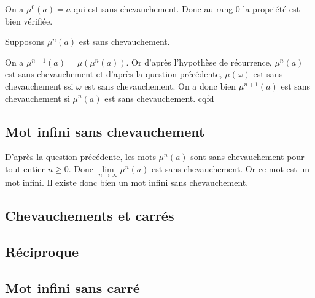 On a $\mu^0(a) = a$ qui est sans chevauchement. Donc au rang $0$ la propriété est bien vérifiée.

Supposons $\mu^n(a)$ est sans chevauchement.

On a $\mu^{n+1}(a) = \mu(\mu^{n}(a))$. Or d'après l'hypothèse de récurrence, $\mu^n(a)$ est sans chevauchement et d'après la question précédente, $\mu(\omega)$ est sans chevauchement ssi $\omega$ est sans chevauchement. On a donc bien $\mu^{n+1}(a)$ est sans chevauchement si $\mu^{n}(a)$ est sans chevauchement.
cqfd

\subsection{Mot infini sans chevauchement}
D'après la question précédente, les mots $\mu^n(a)$ sont sans chevauchement pour tout entier $n \geq 0$.
Donc $\lim\limits_{n \to \infty}\mu^n(a)$ est sans chevauchement. Or ce mot est un mot infini. Il existe donc bien un mot infini sans chevauchement.


\subsection{Chevauchements et carrés}


\subsection{Réciproque}


\subsection{Mot infini sans carré}



